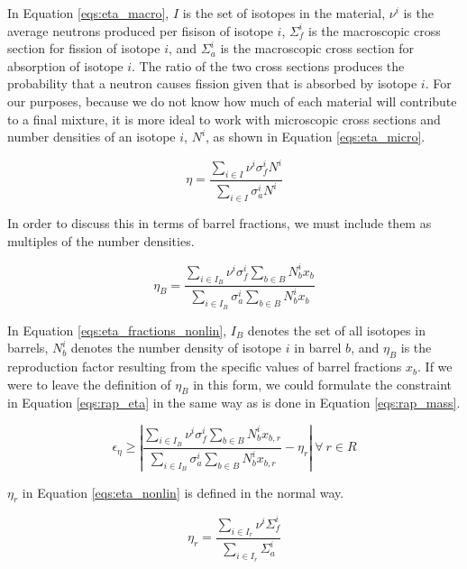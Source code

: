 In Equation \ref{eqs:eta_macro}, $I$ is the set of isotopes in the material,
$\nu^{i}$ is the average neutrons produced per fisison of isotope $i$,
$\Sigma_{f}^{i}$ is the macroscopic cross section for fission of isotope $i$,
and $\Sigma_{a}^{i}$ is the macroscopic cross section for absorption of isotope
$i$. The ratio of the two cross sections produces the probability that a neutron
causes fission given that is absorbed by isotope $i$. For our purposes, because
we do not know how much of each material will contribute to a final mixture, it
is more ideal to work with microscopic cross sections and number densities of an
isotope $i$, $N^{i}$, as shown in Equation \ref{eqs:eta_micro}.

\begin{equation}
\label{eqs:eta_micro}
\eta = \frac{\sum_{i \in I} \nu^{i} \sigma_{f}^{i} N^{i}}
            {\sum_{i \in I} \sigma_{a}^{i} N^{i}}
\end{equation}

In order to discuss this in terms of barrel fractions, we must include them as
multiples of the number densities. 

\begin{equation}
\label{eqs:eta_fractions_nonlin}
\eta_{B} = \frac{\sum_{i \in I_{B}} \nu^{i} \sigma_{f}^{i} \sum_{b \in B} N_{b}^{i} x_{b}}
                {\sum_{i \in I_{B}} \sigma_{a}^{i} \sum_{b \in B} N_{b}^{i} x_{b}}
\end{equation}

In Equation \ref{eqs:eta_fractions_nonlin}, $I_{B}$ denotes the set of all
isotopes in barrels, $N_{b}^{i}$ denotes the number density of isotope $i$ in
barrel $b$, and $\eta_{B}$ is the reproduction factor resulting from the
specific values of barrel fractions $x_{b}$. If we were to leave the definition
of $\eta_{B}$ in this form, we could formulate the constraint in
Equation \ref{eqs:rap_eta} in the same way as is done in
Equation \ref{eqs:rap_mass}.

\begin{equation}
\label{eqs:eta_nonlin}
\epsilon_{\eta} \geq \left| 
\frac{\sum_{i \in I_{B}} \nu^{i} \sigma_{f}^{i} \sum_{b \in B} N_{b}^{i} x_{b,r}}
     {\sum_{i \in I_{B}} \sigma_{a}^{i} \sum_{b \in B} N_{b}^{i} x_{b,r}} 
- \eta_{r} \right|
\: \forall \: r \in R
\end{equation}

$\eta_{r}$ in Equation \ref{eqs:eta_nonlin} is defined in the normal way.

\begin{equation}
\label{eqs:eta_r}
\eta_{r} = \frac{\sum_{i \in I_{r}} \nu^{i} \Sigma_{f}^{i}}
                {\sum_{i \in I_{r}} \Sigma_{a}^{i}}
\end{equation}


